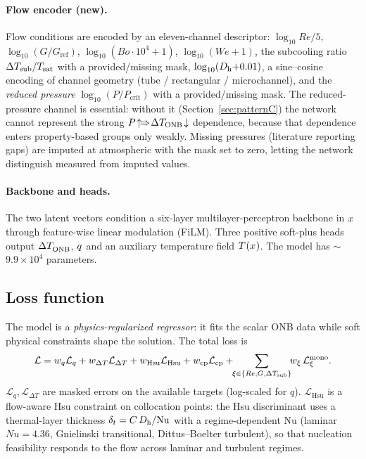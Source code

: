 \paragraph{Flow encoder (new).}
Flow conditions are encoded by an eleven-channel descriptor: $\log_{10}\!Re/5$,
$\log_{10}(G/G_{\mathrm{ref}})$, $\log_{10}(Bo\!\cdot\!10^4{+}1)$,
$\log_{10}(We{+}1)$, the subcooling ratio $\Delta T_{\mathrm{sub}}/T_{\mathrm{sat}}$ with a
provided/missing mask, $\log_{10}(D_{\mathrm{h}}{+}0.01)$, a sine--cosine encoding of
channel geometry (tube / rectangular / microchannel), and the
\emph{reduced pressure} $\log_{10}(P/P_{\mathrm{crit}})$ with a
provided/missing mask. The reduced-pressure channel is essential: without it
(Section~\ref{sec:patternC}) the network cannot represent the strong
$P\!\uparrow\!\Rightarrow\!\Delta T_{\mathrm{ONB}}\!\downarrow$ dependence, because that
dependence enters property-based groups only weakly. Missing pressures
(literature reporting gaps) are imputed at atmospheric with the mask set to
zero, letting the network distinguish measured from imputed values.

\paragraph{Backbone and heads.}
The two latent vectors condition a six-layer multilayer-perceptron backbone in
$x^{\*}$ through feature-wise linear modulation (FiLM). Three positive
soft-plus heads output $\dTonb^{\*}$, $q^{\*}$ and an auxiliary temperature
field $T^{\*}(x^{\*})$. The model has $\sim$\,$9.9\times10^{4}$ parameters.

\subsection{Loss function}
\label{sec:loss}

The model is a \emph{physics-regularized regressor}: it fits the scalar ONB
data while soft physical constraints shape the solution. The total loss is
\begin{equation}
\mathcal{L} = w_q\mathcal{L}_q + w_{\Delta T}\mathcal{L}_{\Delta T}
+ w_{\mathrm{Hsu}}\mathcal{L}_{\mathrm{Hsu}}
+ w_{\mathrm{cp}}\mathcal{L}_{\mathrm{cp}}
+ \!\!\sum_{\xi\in\{Re,G,\Delta T_{\mathrm{sub}}\}}\!\! w_\xi\,\mathcal{L}^{\mathrm{mono}}_{\xi}.
\label{eq:loss}
\end{equation}
$\mathcal{L}_q,\mathcal{L}_{\Delta T}$ are masked errors on the available
targets (log-scaled for $q$). $\mathcal{L}_{\mathrm{Hsu}}$ is a flow-aware Hsu
constraint on collocation points: the Hsu discriminant uses a thermal-layer
thickness $\delta_t = C\,D_{\mathrm{h}}/\mathrm{Nu}$ with a regime-dependent $\mathrm{Nu}$
(laminar $Nu=4.36$, Gnielinski transitional, Dittus--Boelter turbulent), so that
nucleation feasibility responds to the flow across laminar and turbulent regimes.

